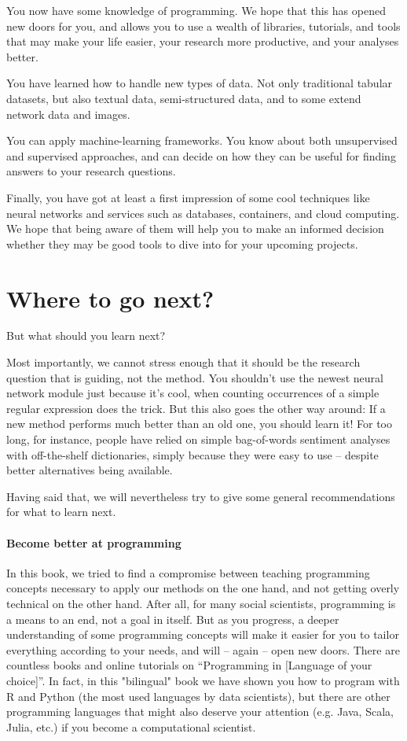 You now have some knowledge of programming. We hope that this has opened new doors for you, and allows you to use a wealth of libraries, tutorials, and tools that may make your life easier, your research more productive, and your analyses better.

You have learned how to handle new types of data. Not only traditional tabular datasets, but also textual data, semi-structured data, and to some extend network data and images.

You can apply machine-learning frameworks. You know about both unsupervised and supervised approaches, and can decide on how they can be useful for finding answers to your research questions.

Finally, you have got at least a first impression of some cool techniques like neural networks and services such as databases, containers, and cloud computing. We hope that being aware of them will help you to make an informed decision whether they may be good tools to dive into for your upcoming projects.



\section{Where to go next?}
But what should you learn next?

Most importantly, we cannot stress enough that it should be the research question that is guiding, not the method. You shouldn't use the newest neural network module just because it's cool, when counting occurrences of a simple regular expression does the trick. But this also goes the other way around: If a new method performs much better than an old one, you should learn it! For too long, for instance, people have relied on simple bag-of-words sentiment analyses with off-the-shelf dictionaries, simply because they were easy to use -- despite better alternatives being available.

Having said that, we will nevertheless try to give some general recommendations for what to learn next.

\paragraph{Become better at programming} In this book, we tried to find a compromise between teaching programming concepts necessary to apply our methods on the one hand, and not getting overly technical on the other hand. After all, for many social scientists, programming is a means to an end, not a goal in itself. But as you progress, a deeper understanding of some programming concepts will make it easier for you to tailor everything according to your needs, and will -- again -- open new doors. There are countless books and online tutorials on ``Programming in [Language of your choice]''. In fact, in this "bilingual" book we have shown you how to program with R and Python (the most used languages by data scientists), but there are other programming languages that might also deserve your attention (e.g. Java, Scala, Julia, etc.) if you become a computational scientist. 


